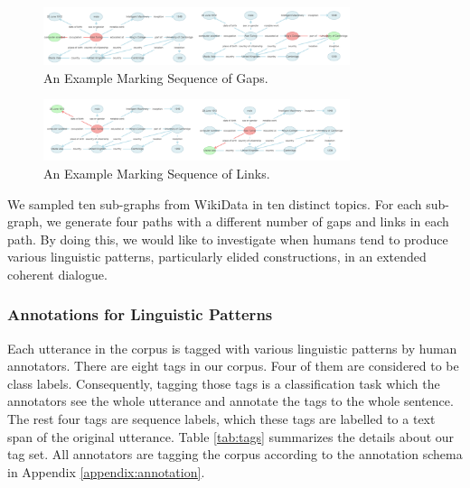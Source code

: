 \documentclass[bsc,frontabs,twoside,singlespacing,parskip,deptreport]{infthesis}     %
\begin{document}
\begin{figure}[h]
    \centering
    \includegraphics[width=0.8\textwidth]{gaps.png}
    \caption{An Example Marking Sequence of Gaps.}
    \label{fig:gaps}
\end{figure}

\begin{figure}[h]
    \centering
    \includegraphics[width=0.8\textwidth]{links.png}
    \caption{An Example Marking Sequence of Links.}
    \label{fig:links}
\end{figure}

We sampled ten sub-graphs from WikiData in ten distinct topics. For each sub-graph, we generate four paths with a different number of gaps and links in each path. By doing this, we would like to investigate when humans tend to produce various linguistic patterns, particularly elided constructions, in an extended coherent dialogue.


\subsubsection*{Annotations for Linguistic Patterns}

Each utterance in the corpus is tagged with various linguistic patterns by human annotators. There are eight tags in our corpus. Four of them are considered to be class labels. Consequently, tagging those tags is a classification task which the annotators see the whole utterance and annotate the tags to the whole sentence. The rest four tags are sequence labels, which these tags are labelled to a text span of the original utterance. Table \ref{tab:tags} summarizes the details about our tag set. All annotators are tagging the corpus according to the annotation schema in Appendix \ref{appendix:annotation}.

\end{document}
